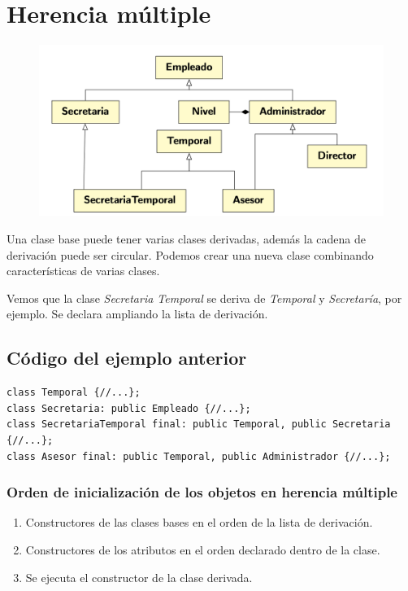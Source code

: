 \section{Herencia múltiple}
\vspace{-0.55cm}
\begin{center}
	\begin{figure}[h]
	\centering
	\includegraphics[width=\textwidth]{Imagenes/gen7.png}
\end{figure}
\end{center}
Una clase base puede tener varias clases derivadas, además la cadena de derivación puede ser circular. Podemos crear una nueva clase combinando características de varias clases.

Vemos que la clase \textit{Secretaria Temporal} se deriva de \textit{Temporal} y \textit{Secretaría}, por ejemplo.
Se declara ampliando la lista de derivación.
\newpage
\subsection{Código del ejemplo anterior}
\begin{center}
	\begin{lstlisting}[frame=single]
class Temporal {//...};
class Secretaria: public Empleado {//...};
class SecretariaTemporal final: public Temporal, public Secretaria {//...};
class Asesor final: public Temporal, public Administrador {//...};
\end{lstlisting}
\end{center}

\subsubsection{Orden de inicialización de los objetos en herencia múltiple}
\begin{enumerate}
	\item Constructores de las clases bases en el orden de la lista de derivación.
	\item Constructores de los atributos en el orden declarado dentro de la clase.
	\item Se ejecuta el constructor de la clase derivada.
\end{enumerate}


